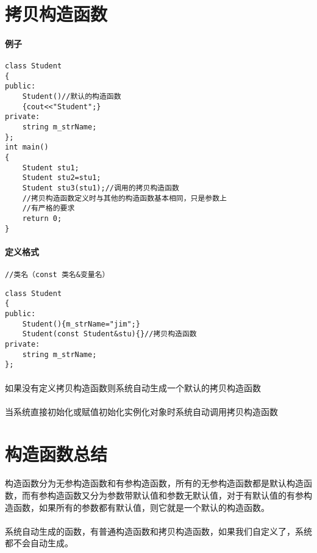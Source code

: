 \documentclass{article}
\begin{document}
\begin{CJK}{UTF8}{gbsn}
\section{拷贝构造函数}
\paragraph{例子}
\begin{verbatim}
class Student
{
public:
	Student()//默认的构造函数
	{cout<<"Student";}
private:
	string m_strName;
};
int main()
{
	Student stu1;
	Student stu2=stu1;
	Student stu3(stu1);//调用的拷贝构造函数
	//拷贝构造函数定义时与其他的构造函数基本相同，只是参数上
	//有严格的要求
	return 0;
}
\end{verbatim}
\paragraph{定义格式}
\paragraph{}
\begin{verbatim}
//类名（const 类名&变量名）
\end{verbatim}
\begin{verbatim}
class Student
{
public:
	Student(){m_strName="jim";}
	Student(const Student&stu){}//拷贝构造函数 
private:
	string m_strName;
};
\end{verbatim}
\paragraph{}
如果没有定义拷贝构造函数则系统自动生成一个默认的拷贝构造函数
\paragraph{}
当系统直接初始化或赋值初始化实例化对象时系统自动调用拷贝构造函数
\section{构造函数总结}
\paragraph{}
构造函数分为无参构造函数和有参构造函数，所有的无参构造函数都是默认构造函数，而有参构造函数又分为参数带默认值和参数无默认值，对于有默认值的有参构造函数，如果所有的参数都有默认值，则它就是一个默认的构造函数。
\paragraph{}
系统自动生成的函数，有普通构造函数和拷贝构造函数，如果我们自定义了，系统都不会自动生成。

\end{CJK}
\end{document}
